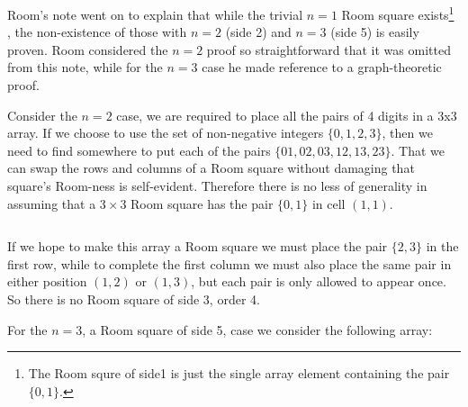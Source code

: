 \documentclass[
  12pt,
  a4paper]{book}
\begin{document}
Room's note went on to explain that while the trivial \(n = 1\) Room
square exists\footnote{The Room squre of side1 is just the single array
  element containing the pair \(\{0,1\}\).} , the non-existence of those
with \(n = 2\) (side 2) and \(n = 3\) (side 5) is easily proven. Room
considered the \(n = 2\) proof so straightforward that it was omitted
from this note, while for the \(n = 3\) case he made reference to a
graph-theoretic proof.

Consider the \(n = 2\) case, we are required to place all the pairs of 4
digits in a 3x3 array. If we choose to use the set of non-negative
integers \(\{0, 1, 2, 3\}\), then we need to find somewhere to put each
of the pairs \(\{01, 02, 03, 12, 13, 23\}\). That we can swap the rows
and columns of a Room square without damaging that square's Room-ness is
self-evident. Therefore there is no less of generality in assuming that
a \(3 \times 3\) Room square has the pair \(\{0, 1\}\) in cell
\((1, 1)\).

\begin{longtable}[]{@{}c@{}}
\toprule
\endhead
\begin{minipage}[t]{0.07\columnwidth}\centering
01\strut
\end{minipage}\tabularnewline
\bottomrule
\end{longtable}

If we hope to make this array a Room square we must place the pair
\(\{2, 3\}\) in the first row, while to complete the first column we
must also place the same pair in either position \((1, 2)\) or
\((1, 3)\), but each pair is only allowed to appear once. So there is no
Room square of side 3, order 4.

For the \(n = 3\), a Room square of side 5, case we consider the
following array:
\end{document}
